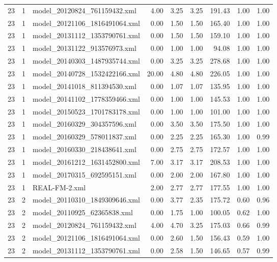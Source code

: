 \begin{table}[ht]
\begin{tabular}{rrlrrrrrr}
   23 &   1 & model\_20120824\_761159432.xml & 4.00 & 3.25 & 3.25 & 191.43 & 1.00 & 1.00 \\ 
   23 &   1 & model\_20121106\_1816491064.xml & 0.00 & 1.50 & 1.50 & 165.40 & 1.00 & 1.00 \\ 
   23 &   1 & model\_20131112\_1353790761.xml & 0.00 & 1.50 & 1.50 & 159.10 & 1.00 & 1.00 \\ 
   23 &   1 & model\_20131122\_913576973.xml & 0.00 & 1.00 & 1.00 & 94.08 & 1.00 & 1.00 \\ 
   23 &   1 & model\_20140303\_1487935744.xml & 0.00 & 3.25 & 3.25 & 278.68 & 1.00 & 1.00 \\ 
   23 &   1 & model\_20140728\_1532422166.xml & 20.00 & 4.80 & 4.80 & 226.05 & 1.00 & 1.00 \\ 
   23 &   1 & model\_20141018\_811394530.xml & 0.00 & 1.07 & 1.07 & 135.95 & 1.00 & 1.00 \\ 
   23 &   1 & model\_20141102\_1778359466.xml & 0.00 & 1.00 & 1.00 & 145.53 & 1.00 & 1.00 \\ 
   23 &   1 & model\_20150523\_1701783178.xml & 0.00 & 1.00 & 1.00 & 101.00 & 1.00 & 1.00 \\ 
   23 &   1 & model\_20160329\_304357596.xml & 0.00 & 3.50 & 3.50 & 175.50 & 1.00 & 1.00 \\ 
   23 &   1 & model\_20160329\_578011837.xml & 0.00 & 2.25 & 2.25 & 165.30 & 1.00 & 0.99 \\ 
   23 &   1 & model\_20160330\_218438641.xml & 0.00 & 2.75 & 2.75 & 172.57 & 1.00 & 1.00 \\ 
   23 &   1 & model\_20161212\_1631452800.xml & 7.00 & 3.17 & 3.17 & 208.53 & 1.00 & 1.00 \\ 
   23 &   1 & model\_20170315\_692595151.xml & 0.00 & 2.00 & 2.00 & 167.80 & 1.00 & 1.00 \\ 
   23 &   1 & REAL-FM-2.xml & 2.00 & 2.77 & 2.77 & 177.55 & 1.00 & 1.00 \\ 
   23 &   2 & model\_20110310\_1849309646.xml & 0.00 & 3.77 & 2.35 & 175.72 & 0.60 & 0.96 \\ 
   23 &   2 & model\_20110925\_62365838.xml & 0.00 & 1.75 & 1.00 & 100.05 & 0.62 & 1.00 \\ 
   23 &   2 & model\_20120824\_761159432.xml & 4.00 & 4.70 & 3.25 & 175.03 & 0.66 & 0.99 \\ 
   23 &   2 & model\_20121106\_1816491064.xml & 0.00 & 2.60 & 1.50 & 156.43 & 0.59 & 1.00 \\ 
   23 &   2 & model\_20131112\_1353790761.xml & 0.00 & 2.58 & 1.50 & 146.65 & 0.57 & 0.99 \\ 

\end{tabular}
\end{table}

